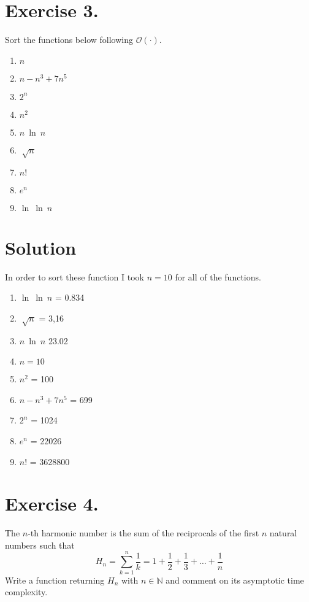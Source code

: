 \documentclass{article}
\begin{document}
\section*{Exercise 3.}
Sort the functions below following $\mathcal{O(\cdot)}$.
\begin{multicols}{3}
\begin{enumerate}
    \item $n$
    \item $n - n^3 + 7n^5$
    \item $2^n$
    \item $n^2$
    \item $n\ \ln\ n$
    \item $\sqrt[]{n}$
    \item $n!$
    \item $e^n$
    \item $\ln\ \ln\ n$
\end{enumerate}
\end{multicols}

\section*{Solution}
In order to sort these function I took $n = 10$ for all of the functions.
\begin{enumerate}
        \item $\ln\ \ln\ n$ = 0.834
        \item $\sqrt[]{n}$ = 3,16
        \item $n\ \ln\ n$ 23.02
        \item $n = 10$
    \item $n^2$ = 100
    \item $n - n^3 + 7n^5$ = 699
    \item $2^n$ = 1024
        \item $e^n$ = 22026
        \item $n!$ = 3628800
\end{enumerate}



\section*{Exercise 4.}
The $n$-th harmonic number is the sum of the reciprocals of the first $n$ natural numbers such that
\[
H_n = \sum_{k=1}^n \frac{1}{k} = 1 + \frac{1}{2} + \frac{1}{3} + \ldots + \frac{1}{n}
\]
Write a function returning $H_n$ with $n \in \mathbb{N}$ and comment on its asymptotic time complexity.
\end{document}
